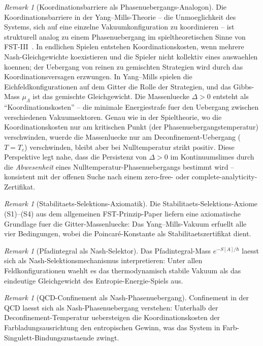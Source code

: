 \documentclass[12pt,a4paper]{article}
\theoremstyle{definition}
\theoremstyle{plain}
\theoremstyle{remark}
\newtheorem{remark}[definition]{Remark}
\begin{document}
\begin{remark}[Koordinationsbarriere als Phasenuebergangs-Analogon]
\label{rem:coordination-barrier}
Die Koordinationsbarriere in der Yang--Mills-Theorie -- die
Unmoeglichkeit des Systems, sich auf eine einzelne Vakuumkonfiguration
zu koordinieren -- ist strukturell analog zu einem Phasenuebergang
im spieltheoretischen Sinne von FST-III~\cite{FST-Unified2026}.
In endlichen Spielen entstehen Koordinationskosten, wenn mehrere
Nash-Gleichgewichte koexistieren und die Spieler nicht kollektiv eines
auswaehlen koennen; der Uebergang von reinen zu gemischten Strategien
wird durch das Koordinationsversagen erzwungen.
In Yang--Mills spielen die Eichfeldkonfigurationen auf dem Gitter die
Rolle der Strategien, und das Gibbs-Mass $\mu_\Lambda$ ist das gemischte
Gleichgewicht. Die Massenluecke $\Delta > 0$ entsteht als
``Koordinationskosten'' -- die minimale Energiestrafe fuer den
Uebergang zwischen verschiedenen Vakuumsektoren. Genau wie in der
Spieltheorie, wo die Koordinationskosten nur am kritischen Punkt
(der Phasenuebergangstemperatur) verschwinden, wuerde die Massenluecke
nur am Deconfinement-Uebergang ($T = T_c$) verschwinden, bleibt aber
bei Nulltemperatur strikt positiv. Diese Perspektive legt nahe, dass
die Persistenz von $\Delta > 0$ im Kontinuumslimes durch die
\emph{Abwesenheit} eines Nulltemperatur-Phasenuebergangs bestimmt
wird -- konsistent mit der offenen Suche nach einem zero-free- oder
complete-analyticity-Zertifikat.
\end{remark}

\begin{remark}[Stabilitaets-Selektions-Axiomatik]
\label{rem:stability-selection}
Die Stabilitaets-Selektions-Axiome (S1)--(S4) aus dem allgemeinen FST-Prinzip-Paper liefern eine axiomatische Grundlage fuer die Gitter-Massenluecke: Das Yang--Mills-Vakuum erfuellt alle vier Bedingungen, wobei die Poincar\'e-Konstante als Stabilitaetszertifikat dient.
\end{remark}

\begin{remark}[Pfadintegral als Nash-Selektor]
\label{rem:path-integral-nash}
Das Pfadintegral-Mass $e^{-S[A]/\hbar}$ laesst sich als Nash-Selektionsmechanismus interpretieren: Unter allen Feldkonfigurationen waehlt es das thermodynamisch stabile Vakuum als das eindeutige Gleichgewicht des Entropie-Energie-Spiels aus.
\end{remark}

\begin{remark}[QCD-Confinement als Nash-Phasenuebergang]
\label{rem:qcd-confinement-nash}
Confinement in der QCD laesst sich als Nash-Phasenuebergang verstehen: Unterhalb der Deconfinement-Temperatur uebersteigen die Koordinationskosten der Farbladungsausrichtung den entropischen Gewinn, was das System in Farb-Singulett-Bindungszustaende zwingt.
\end{remark}
\end{document}
